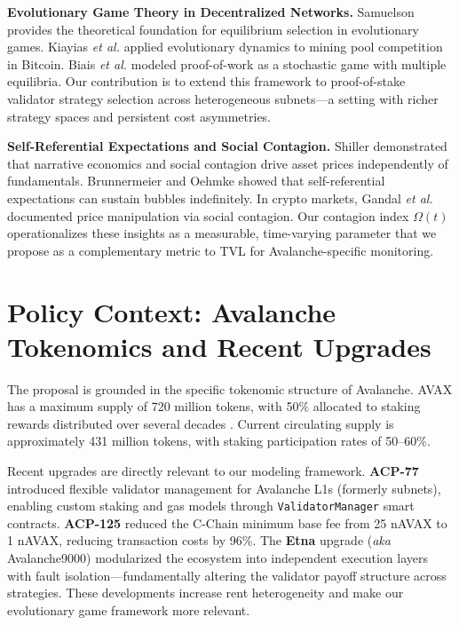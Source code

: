 \documentclass[11pt,a4paper]{article}
\begin{document}
\noindent\textbf{Evolutionary Game Theory in Decentralized Networks.} Samuelson \cite{samuelson2016} provides the theoretical foundation for equilibrium selection in evolutionary games. Kiayias \textit{et al.} \cite{kiayias2016} applied evolutionary dynamics to mining pool competition in Bitcoin. Biais \textit{et al.} \cite{biais2019} modeled proof-of-work as a stochastic game with multiple equilibria. Our contribution is to extend this framework to proof-of-stake validator strategy selection across heterogeneous subnets---a setting with richer strategy spaces and persistent cost asymmetries.

\noindent\textbf{Self-Referential Expectations and Social Contagion.} Shiller \cite{shiller2019} demonstrated that narrative economics and social contagion drive asset prices independently of fundamentals. Brunnermeier and Oehmke \cite{brunnermeier2013} showed that self-referential expectations can sustain bubbles indefinitely. In crypto markets, Gandal \textit{et al.} \cite{gandal2018} documented price manipulation via social contagion. Our contagion index $\Omega(t)$ operationalizes these insights as a measurable, time-varying parameter that we propose as a complementary metric to TVL for Avalanche-specific monitoring.

\section{Policy Context: Avalanche Tokenomics and Recent Upgrades}

The proposal is grounded in the specific tokenomic structure of Avalanche. AVAX has a maximum supply of 720 million tokens, with 50\% allocated to staking rewards distributed over several decades \cite{rocket2019}. Current circulating supply is approximately 431 million tokens, with staking participation rates of 50--60\%.

Recent upgrades are directly relevant to our modeling framework. \textbf{ACP-77} introduced flexible validator management for Avalanche L1s (formerly subnets), enabling custom staking and gas models through \texttt{ValidatorManager} smart contracts. \textbf{ACP-125} reduced the C-Chain minimum base fee from 25 nAVAX to 1 nAVAX, reducing transaction costs by 96\%. The \textbf{Etna} upgrade (\textit{aka} Avalanche9000) modularized the ecosystem into independent execution layers with fault isolation---fundamentally altering the validator payoff structure across strategies. These developments increase rent heterogeneity and make our evolutionary game framework more relevant.
\end{document}
